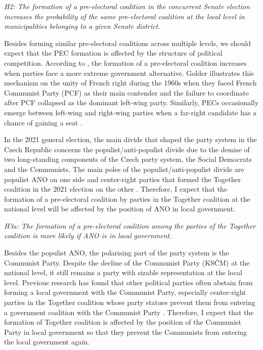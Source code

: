 \documentclass[]{interact}
\theoremstyle{plain}%
\theoremstyle{definition}
\theoremstyle{remark}
\begin{document}
\vspace{12pt}
\textit{H2: The formation of a pre-electoral coalition in the concurrent Senate election increases the probability of the same pre-electoral coalition at the local level in municipalities belonging to a given Senate district.\label{hyp:2}}
\vspace{12pt}

Besides forming similar pre-electoral coalitions across multiple levels, we should expect that the PEC formation is affected by the structure of political competition. 
According to \citet{golder2006}, the formation of a pre-electoral coalition increases when parties face a more extreme government alternative. Golder illustrates this mechanism on the unity of French right during the 1960s when they faced French Communist Party (PCF) as their main contender and the failure to coordinate after PCF collapsed as the dominant left-wing party. Similarly, PECs occasionally emerge between left-wing and right-wing parties when a far-right candidate has a chance of gaining a seat \citep[73]{golder2006}. 

In the 2021 general election, the main divide that shaped the party system in the Czech Republic concerns the populist/anti-populist divide due to the demise of two long-standing components of the Czech party system, the Social Democrats and the Communists. The main poles of the populist/anti-populist divide are populist ANO on one side and center-right parties that formed the Together coalition in the 2021 election on the other \citep{havlik2022}. 
Therefore, I expect that the formation of a pre-electoral coalition by parties in the Together coalition at the national level will be affected by the position of ANO in local government.

\vspace{12pt}
\textit{H3a: The formation of a pre-electoral coalition among the parties of the Together coalition is more likely if ANO is in local government.\label{hyp:3.1}}
\vspace{12pt}

Besides the populist ANO, the polarising part of the party system is the Communist Party.
Despite the decline of the Communist Party (KSČM) at the national level, it still remains a party with sizable representation at the local level. Previous research has found that other political parties often abstain from forming a local government with the Communist Party, especially center-right parties in the Together coalition whose party statues prevent them from entering a government coalition with the Communist Party \citep{skvrnak2021}. Therefore, I expect that the formation of Together coalition is affected by the position of the Communist Party in local government so that they prevent the Communists from entering the local government again.
\end{document}
